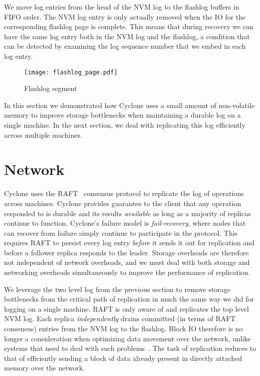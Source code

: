 \documentclass[twocolumn]{article}
\begin{document}
We move log entries from the head of the NVM log to the flashlog buffers in FIFO
order. The NVM log entry is only actually removed when the IO for the
corresponding flashlog page is complete. This means that during recovery we can
have the same log entry both in the NVM log and the flashlog, a condition that
can be detected by examining the log sequence number that we embed in each log
entry.

\begin{figure}
  \centering
  \texttt{[image: flashlog\_page.pdf]}
  \caption{Flashlog segment}
  \label{fig:flashlog_page}
\end{figure}

In this section we demonstrated how Cyclone uses a small amount of non-volatile
memory to improve storage bottlenecks when maintaining a durable log on a single
machine. In the next section, we deal with replicating this log efficiently
across multiple machines.

\section{Network}
\label{sec:network}
Cyclone uses the RAFT~\cite{raft} consensus protocol to replicate the log of
operations across machines. Cyclone provides guarantee to the client that any
operation responded to is durable and its results \emph{available} as long as a
majority of replicas continue to function. Cyclone's failure model is
\emph{fail-recovery}, where nodes that can recover from failure simply continue
to participate in the protocol. This requires RAFT to persist every log entry
\emph{before} it sends it out for replication and before a follower replica
responds to the leader. Storage overheads are therefore not independent of
network overheads, and we must deal with both storage and networking overheads
simultaneously to improve the performance of replication.

We leverage the two level log from the previous section to remove storage
bottlenecks from the critical path of replication in much the same way we did
for logging on a single machine. RAFT is only aware of and replicates the top
level NVM log. Each replica \emph{independently} drains committed (in terms of
RAFT consensus) entries from the NVM log to the flashlog. Block IO therefore is
no longer a consideration when optimizing data movement over the network, unlike
systems that need to deal with such problems~\cite{reflex}. The task of
replication reduces to that of efficiently sending a block of data already
present in directly attached memory over the network. 
\end{document}
